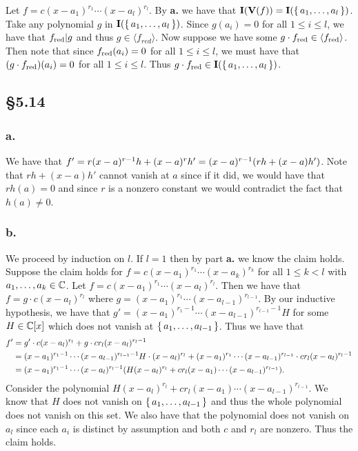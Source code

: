 \documentclass[letterpaper]{article}
\begin{document}
Let $f = c(x - a_{1})^{r_{1}} \cdots (x - a_{l})^{r_{l}}$. By \textbf{a.} we have that $\mathbf{I}(\textbf{V}(f)) = \mathbf{I}\pqty{\set{a_{1}, \ldots, a_{l}}}$. Take any polynomial $g$ in $\mathbf{I}\pqty{\set{a_{1}, \ldots, a_{l}}}$. Since $g(a_{i}) = 0$ for all $1 \leq i \leq l$, we have that $f_{\text{red}} | g$ and thus $g \in \langle f_{red} \rangle$. Now suppose we have some $g \cdot f_{\text{red}} \in \langle f_{\text{red}} \rangle$. Then note that since $f_{\text{red}}(a_{i}) = 0$ for all $1 \leq i \leq l$, we must have that $\pqty{g \cdot f_{\red}}(a_{i}) = 0$ for all $1 \leq i \leq l$. Thus $g \cdot f_{\red} \in \mathbf{I}\pqty{\set{a_{1}, \ldots, a_{l}}}$.

\subsection*{\S 5.14}

\subsubsection*{a.}

We have that $f' = r(x - a)^{r - 1} h + (x - a)^{r} h' = (x - a)^{r-1} \pqty{rh + (x - a)h'}$. Note that $rh + (x - a)h'$ cannot vanish at $a$ since if it did, we would have that $rh(a) = 0$ and since $r$ is a nonzero constant we would contradict the fact that $h(a) \neq 0$.

\subsubsection*{b.}

We proceed by induction on $l$. If $l = 1$ then by part \textbf{a.} we know the claim holds. Suppose the claim holds for $f = c(x - a_{1})^{r_{1}} \cdots (x - a_{k})^{r_{k}}$ for all $1 \leq k < l$ with $a_{1}, \ldots, a_{k} \in \mathbb{C}$. Let $f = c(x - a_{1})^{r_{1}} \cdots (x - a_{l})^{r_{l}}$. Then we have that $f = g \cdot c (x - a_{l})^{r_{l}}$ where $g = (x - a_{1})^{r_{1}} \cdots (x - a_{l - 1})^{r_{l - 1}}$. By our inductive hypothesis, we have that $g' = (x - a_{1})^{r_{1} - 1} \cdots (x - a_{l - 1})^{r_{l - 1} - 1} H$ for some $H \in \mathbb{C}[x]$ which does not vanish at $\set{a_{1}, \ldots, a_{l -1}}$. Thus we have that
\begin{align*}
  f' &= g' \cdot c (x - a_{l})^{r_{l}} + g \cdot c r_{l}(x - a_{l})^{r_{l} - 1} \\
     &= (x - a_{1})^{r_{1} - 1} \cdots (x - a_{l - 1})^{r_{l - 1} - 1} H \cdot (x - a_{l})^{r_{l}} + (x - a_{1})^{r_{1}} \cdots (x - a_{l - 1})^{r_{l - 1}} \cdot c r_{l}(x - a_{l})^{r_{l} - 1} \\
     &= (x - a_{1})^{r_{1} - 1} \cdots (x - a_{l})^{r_{l} - 1} \pqty{H(x - a_{l})^{r_{l}} + c r_{l}(x - a_{1}) \cdots (x - a_{l - 1})^{r_{l - 1}}}.
\end{align*}
Consider the polynomial $H(x - a_{l})^{r_{l}} + c r_{l}(x - a_{1}) \cdots (x - a_{l - 1})^{r_{l - 1}}$. We know that $H$ does not vanish on $\set{a_{1}, \ldots, a_{l -1}}$ and thus the whole polynomial does not vanish on this set. We also have that the polynomial does not vanish on $a_{l}$ since each $a_{i}$ is distinct by assumption and both $c$ and $r_{l}$ are nonzero. Thus the claim holds.
\end{document}
